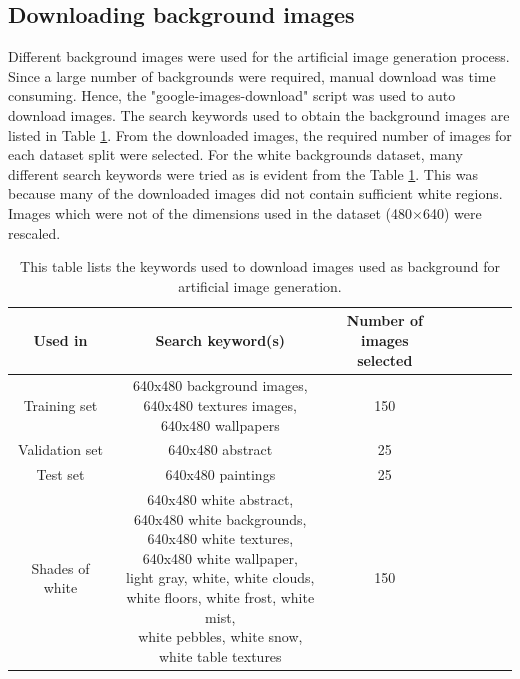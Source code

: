 \subsection{Downloading background images}
Different background images were used for the artificial image generation process. Since a large number of backgrounds were required, manual download was time consuming. Hence, the "google-images-download" \cite{image_downloader} script was used to auto download images. The search keywords used to obtain the background images are listed in Table \ref{Table:download}. From the downloaded images, the required number of images for each dataset split were selected. For the white backgrounds dataset, many different search keywords were tried as is evident from the Table  \ref{Table:download}. This was because many of the downloaded images did not contain sufficient white regions. Images which were not of the dimensions used in the dataset (480$\times$640) were rescaled.

\begin{table}
	\centering
	\begin{tabular}{|c|c|c|c|c|c|c|c|}
	\hline 
    Used in & Search keyword(s) & \makecell{Number of \\images selected} \\ 
	\hline 
	Training set & \makecell{640x480 background images, \\640x480 textures images, \\640x480 wallpapers} & 150 \\ 
	\hline 
	Validation set & 640x480 abstract & 25 \\ 
	\hline 
	Test set & 640x480 paintings & 25 \\ 
	\hline 
	Shades of white & \makecell{640x480 white abstract, \\640x480 white backgrounds, \\640x480 white textures, \\640x480 white wallpaper, \\light gray, white, white clouds, \\white floors, white frost, white mist, \\white pebbles, white snow, \\white table textures} & 150 \\ 
	\hline 
	\end{tabular}
	\caption{This table lists the keywords used to download images used as background for artificial image generation.} 
	\label{Table:download}
\end{table}

